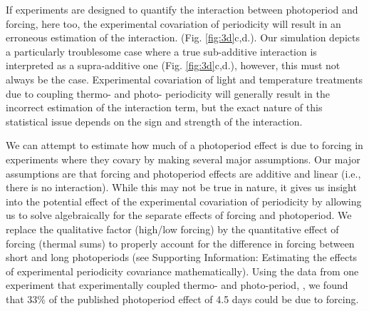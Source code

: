 \documentclass[11pt]{article}
\begin{document}
If experiments are designed to quantify the interaction between photoperiod and forcing, here too, the experimental covariation of periodicity will result in an erroneous estimation of the interaction. (Fig. \ref{fig:3d}c,d.). Our simulation depicts a particularly troublesome case where a true sub-additive interaction is interpreted as a supra-additive one (Fig. \ref{fig:3d}c,d.), however, this must not always be the case. Experimental covariation of light and temperature treatments due to coupling thermo- and photo- periodicity will generally result in the incorrect estimation of the interaction term, but the exact nature of this statistical issue depends on the sign and strength of the interaction.


We can attempt to estimate how much of a photoperiod effect is due to forcing in experiments where they covary by making several major assumptions. Our major assumptions are that forcing and photoperiod effects are additive and linear (i.e., there is no interaction). While this may not be true in nature, it gives us insight into the potential effect of the experimental covariation of periodicity by allowing us to solve algebraically for the separate effects of forcing and photoperiod. We replace the qualitative factor (high/low forcing) by the quantitative effect of forcing (thermal sums) to properly account for the difference in forcing between short and long photoperiods (see Supporting Information: Estimating the effects of experimental periodicity covariance mathematically). Using the data from one experiment that experimentally coupled thermo- and photo-period, \citet{Flynn2018}, we found that 33\% of the published photoperiod effect of 4.5 days could be due to forcing. 
\end{document}
